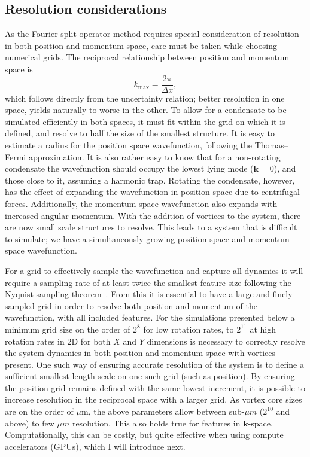 \subsection{Resolution considerations}
As the Fourier split-operator method requires special consideration of resolution in both position and momentum space, care must be taken while choosing numerical grids. The reciprocal relationship between position and momentum space is \begin{equation}
    k_{\text{max}} = \frac{2\pi}{\Delta x},
\end{equation}
which follows directly from the uncertainty relation; better resolution in one space, yields naturally to worse in the other. To allow for a condensate to be simulated efficiently in both spaces, it must fit within the grid on which it is defined, and resolve to half the size of the smallest structure. It is easy to estimate a radius for the position space wavefunction, following the Thomas--Fermi approximation. It is also rather easy to know that for a non-rotating condensate the wavefunction should occupy the lowest lying mode ($\mathbf{k}=0$), and those close to it, assuming a harmonic trap. Rotating the condensate, however, has the effect of expanding the wavefunction in position space due to centrifugal forces. Additionally, the momentum space wavefunction also expands with increased angular momentum. With the addition of vortices to the system, there are now small scale structures to resolve. This leads to a system that is difficult to simulate; we have a simultaneously growing position space and momentum space wavefunction.

For a grid to effectively sample the wavefunction and capture all dynamics it will require a sampling rate of at least twice the smallest feature size following the Nyquist sampling theorem~\cite{BK:NumRecipes}. From this it is essential to have a large and finely sampled grid in order to resolve both position and momentum of the wavefunction, with all included features. For the simulations presented below a minimum grid size on the order of $2^8$ for low rotation rates, to $2^{11}$ at high rotation rates in 2D for both $X$ and $Y$ dimensions is necessary to correctly resolve the system dynamics in both position and momentum space with vortices present. One such way of ensuring accurate resolution of the system is to define a sufficient smallest length scale on one such grid (such as position). By ensuring the position grid remains defined with the same lowest increment, it is possible to increase resolution in the reciprocal space with a larger grid. As vortex core sizes are on the order of $\mu$m, the above parameters allow between sub-$\mu m$ ($2^{10}$ and above) to few $\mu m$ resolution. This also holds true for features in $\mathbf{k}$-space. Computationally, this can be costly, but quite effective when using compute accelerators (GPUs), which I will introduce next. %
